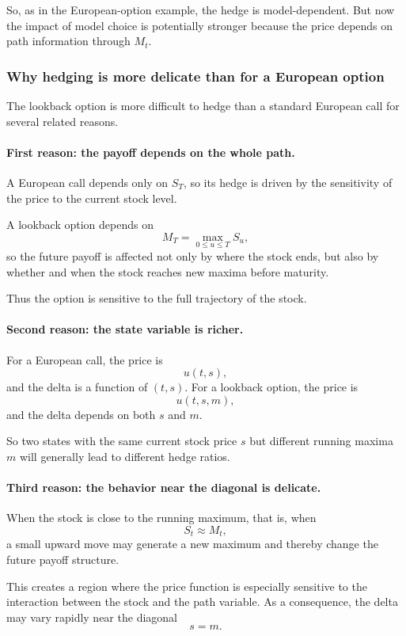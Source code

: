 \documentclass[11pt]{article}
\theoremstyle{plain}
\theoremstyle{definition}
\theoremstyle{remark}
\begin{document}
So, as in the European-option example, the hedge is model-dependent.
But now the impact of model choice is potentially stronger because the
price depends on path information through \(M_t\).

\subsubsection{Why hedging is more delicate than for a European option}

The lookback option is more difficult to hedge than a standard European
call for several related reasons.

\paragraph{First reason: the payoff depends on the whole path.}
A European call depends only on \(S_T\), so its hedge is driven by the
sensitivity of the price to the current stock level.

A lookback option depends on
\[
M_T=\max_{0\le u\le T}S_u,
\]
so the future payoff is affected not only by where the stock ends, but
also by whether and when the stock reaches new maxima before maturity.

Thus the option is sensitive to the full trajectory of the stock.

\paragraph{Second reason: the state variable is richer.}
For a European call, the price is
\[
u(t,s),
\]
and the delta is a function of \((t,s)\).
For a lookback option, the price is
\[
u(t,s,m),
\]
and the delta depends on both \(s\) and \(m\).

So two states with the same current stock price \(s\) but different
running maxima \(m\) will generally lead to different hedge ratios.

\paragraph{Third reason: the behavior near the diagonal is delicate.}
When the stock is close to the running maximum, that is, when
\[
S_t\approx M_t,
\]
a small upward move may generate a new maximum and thereby change the
future payoff structure.

This creates a region where the price function is especially sensitive
to the interaction between the stock and the path variable.
As a consequence, the delta may vary rapidly near the diagonal
\[
s=m.
\]
\end{document}
